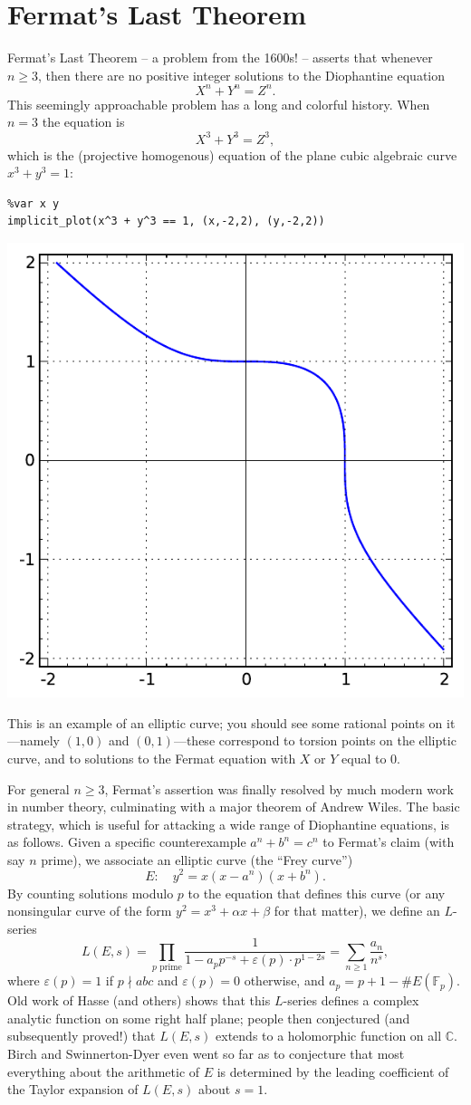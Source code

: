 \documentclass{book}
\newcommand{\C}{\mathbb{C}}
\newcommand{\F}{\mathbb{F}}
\begin{document}
\section{Fermat's Last Theorem}
Fermat's Last Theorem -- a problem from the 1600s! -- asserts
that whenever $n\geq 3$, then there are no positive integer
solutions to the Diophantine equation
$$
X^n + Y^n = Z^n.
$$
This seemingly approachable problem has a long and colorful
history.
When $n=3$ the equation is
$$
X^3 + Y^3 = Z^3,
$$
which is the (projective homogenous) equation of the plane cubic algebraic
curve $x^3 + y^3 = 1$:
\begin{lstlisting}
%var x y
implicit_plot(x^3 + y^3 == 1, (x,-2,2), (y,-2,2))
\end{lstlisting}
\begin{center}
\includegraphics[width=.5\textwidth]{pics/flt3.pdf}
\end{center}
This is an example of an elliptic curve; you should
see some rational points on it---namely $(1,0)$ and $(0,1)$---these
correspond to torsion points on the elliptic curve, and to solutions
to the Fermat equation with $X$ or $Y$ equal to $0$.

For general $n\geq 3$, Fermat's assertion was finally resolved by much modern
work in number theory, culminating with a major theorem of
Andrew Wiles.  The basic strategy, which is useful for
attacking a wide range of Diophantine equations, is as follows.
Given a specific counterexample
$a^n + b^n = c^n$ to Fermat's claim (with say $n$ prime), we associate
an elliptic curve (the ``Frey curve'')
$$
  E: \quad y^2 = x(x-a^n)(x+b^n).
$$
By counting solutions modulo $p$ to the equation that defines this curve (or
any nonsingular curve of the form $y^2=x^3+\alpha x + \beta$ for that matter),
we define an $L$-series
$$
L(E,s) =
\prod_{p \text{ prime}} \frac{1}{1-a_p p^{-s} + \varepsilon(p)\cdot p^{1-2s}}
 = \sum_{n\geq 1} \frac{a_n}{n^s},
$$
where $\varepsilon(p)=1$ if $p\nmid abc$ and $\varepsilon(p)=0$ otherwise,
and $a_p = p+1-\#E(\F_p)$.
Old work of Hasse (and others)
shows that this $L$-series defines a complex analytic
function on some right half plane; people then conjectured (and
subsequently proved!)
that $L(E,s)$ extends to a holomorphic function on all $\C$.
Birch and Swinnerton-Dyer even went so far as to conjecture
that most everything about the arithmetic of $E$
is determined by the leading coefficient of the
Taylor expansion of $L(E,s)$ about $s=1$.
\end{document}
